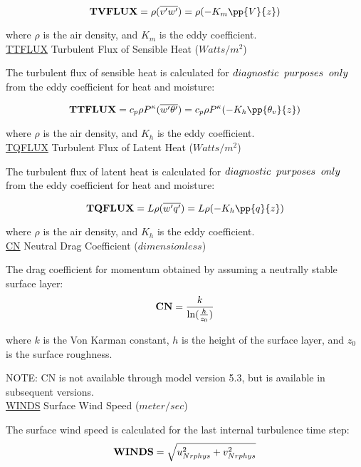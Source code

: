 \[
{\bf TVFLUX} =  {\rho } {(\overline{v^{\prime}w^{\prime}})} = 
 {\rho } {(- K_m \pp{V}{z})}
\]
 
\noindent
where $\rho$ is the air density, and $K_m$ is the eddy coefficient.
\\


\noindent
{ \underline {TTFLUX}  Turbulent Flux of Sensible Heat ($Watts/m^2$) }

\noindent
The turbulent flux of sensible heat is calculated for $diagnostic \hspace{.2cm} purposes 
\hspace{.2cm} only$ from the eddy coefficient for heat and moisture:

\noindent
\[
{\bf TTFLUX} = c_p {\rho }  
P^{\kappa}{(\overline{w^{\prime}\theta^{\prime}})}
 = c_p  {\rho } P^{\kappa}{(- K_h \pp{\theta_v}{z})}
\]
 
\noindent
where $\rho$ is the air density, and $K_h$ is the eddy coefficient.
\\


\noindent
{ \underline {TQFLUX}  Turbulent Flux of Latent Heat ($Watts/m^2$) }

\noindent
The turbulent flux of latent heat is calculated for $diagnostic \hspace{.2cm} purposes 
\hspace{.2cm} only$ from the eddy coefficient for heat and moisture:

\noindent
\[
{\bf TQFLUX} = {L {\rho } (\overline{w^{\prime}q^{\prime}})} = 
{L {\rho }(- K_h \pp{q}{z})}
\]
 
\noindent
where $\rho$ is the air density, and $K_h$ is the eddy coefficient.
\\

 
\noindent
{ \underline {CN}  Neutral Drag Coefficient ($dimensionless$) }

\noindent
The drag coefficient for momentum obtained by assuming a neutrally stable surface layer:
\[
{\bf CN} = { k \over { \ln({h \over {z_0}})} }
\]

\noindent
where $k$ is the Von Karman constant, $h$ is the height of the surface layer, and
$z_0$ is the surface roughness. 

\noindent
NOTE: CN is not available through model version 5.3, but is available in subsequent
versions.
\\

\noindent
{ \underline {WINDS}  Surface Wind Speed ($meter/sec$) }

\noindent
The surface wind speed is calculated for the last internal turbulence time step:
\[
{\bf WINDS} = \sqrt{u_{Nrphys}^2 + v_{Nrphys}^2}
\]

